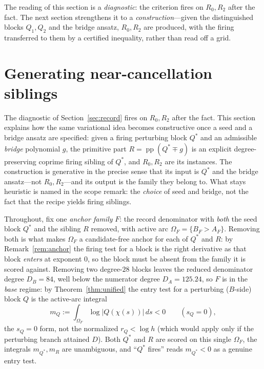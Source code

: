 \documentclass[11pt,reqno]{amsart}
\theoremstyle{plain}
\theoremstyle{definition}
\theoremstyle{remark}
\newcommand{\rQ}{r_Q}
\newcommand{\dA}{D_A}
\newcommand{\dB}{D_B}
\DeclareMathOperator{\pp}{pp}
\begin{document}
The reading of this section is a \emph{diagnostic}: the criterion fires on $R_0,R_2$
after the fact. The next section strengthens it to a \emph{construction}---given the
distinguished blocks $Q_1,Q_2$ and the bridge ansatz, $R_0,R_2$ are produced, with the
firing transferred to them by a certified inequality, rather than read off a grid.

\section{Generating near-cancellation siblings}\label{sec:generator}

The diagnostic of Section~\ref{sec:record} fires on $R_0,R_2$ after the fact.
This section explains how the same variational idea becomes constructive once a seed and a bridge ansatz are specified: given a firing perturbing block $Q^*$ and an
admissible \emph{bridge} polynomial $g$, the primitive part $R=\pp(Q^*\mp g)$ is an
explicit degree-preserving coprime firing sibling of $Q^*$, and $R_0,R_2$ are its
instances. The construction is generative in the precise sense that its input is
$Q^*$ and the bridge ansatz---not $R_0,R_2$---and its output is the family they belong
to. What stays heuristic is named in the scope remark: the \emph{choice} of seed and
bridge, not the fact that the recipe yields firing siblings.

Throughout, fix one \emph{anchor family} $F$: the record denominator with \emph{both}
the seed block $Q^*$ and the sibling $R$ removed, with active arc
$\Omega_F=\{B_F>A_F\}$. Removing both is what makes $\Omega_F$ a candidate-free anchor
for each of $Q^*$ and $R$: by Remark~\ref{rem:anchor} the firing test for a block is the
right derivative as that block \emph{enters} at exponent $0$, so the block must be absent
from the family it is scored against. Removing two degree-$28$ blocks leaves the reduced
denominator degree $\dB=84$, well below the numerator degree $\dA=125.24$, so $F$ is in
the \emph{base} regime: by Theorem~\ref{thm:unified} the entry test for a perturbing
($B$-side) block $Q$ is the active-arc integral
\begin{equation}\label{eq:mdef}
  m_Q:=\int_{\Omega_F}\log|Q(\chi(s))|\,ds<0\qquad(s_Q=0),
\end{equation}
the $s_Q=0$ form, not the normalized $\rQ<\log h$ (which would apply only if the
perturbing branch attained $D$). Both $Q^*$ and $R$ are scored on this single
$\Omega_F$, the integrals $m_{Q^*},m_R$ are unambiguous, and ``$Q^*$ fires'' reads
$m_{Q^*}<0$ as a genuine entry test.
\end{document}
